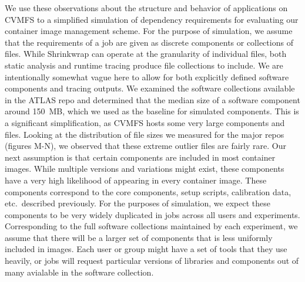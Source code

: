 \documentclass[conference]{IEEEtran}
\begin{document}
We use these observations about the structure and behavior of applications on CVMFS to a simplified simulation of dependency requirements for evaluating our container image management scheme.
For the purpose of simulation,
we assume that the requirements of a job are given as discrete components or collections of files.
While Shrinkwrap can operate at the granularity of individual files,
both static analysis and runtime tracing produce file collections to include.
We are intentionally somewhat vague here to allow for both explicitly defined software components and tracing outputs.
We examined the software collections available in the ATLAS repo and determined that the median size of a software component around 150~MB,
which we used as the baseline for simulated components.
This is a significant simplification,
as CVMFS hosts some very large components and files.
Looking at the distribution of file sizes we measured for the major repos (figures M-N),
we observed that these extreme outlier files are fairly rare.
Our next assumption is that certain components are included in most container images.
While multiple versions and variations might exist,
these components have a very high likelihood of appearing in every container image.
These components correspond to the core components, setup scripts, calibration data, etc.\ described previously.
For the purposes of simulation,
we expect these components to be very widely duplicated in jobs across all users and experiments.
Corresponding to the full software collections maintained by each experiment,
we assume that there will be a larger set of components that is less uniformly included in images.
Each user or group might have a set of tools that they use heavily,
or jobs will request particular versions of libraries and components out of many avialable in the software collection.
\end{document}
